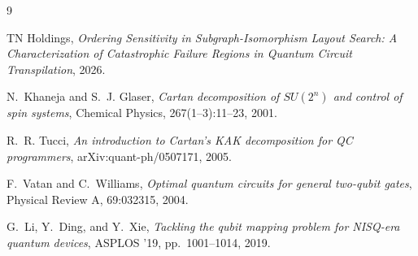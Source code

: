 \documentclass[11pt]{article}
\begin{document}
\begin{thebibliography}{9}

TN Holdings,
\emph{Ordering Sensitivity in Subgraph-Isomorphism Layout Search: A
Characterization of Catastrophic Failure Regions in Quantum Circuit
Transpilation}, 2026.

N.~Khaneja and S.~J. Glaser,
\emph{Cartan decomposition of $SU(2^n)$ and control of spin systems},
Chemical Physics, 267(1--3):11--23, 2001.

R.~R. Tucci,
\emph{An introduction to Cartan's KAK decomposition for QC
programmers}, arXiv:quant-ph/0507171, 2005.

F.~Vatan and C.~Williams,
\emph{Optimal quantum circuits for general two-qubit gates},
Physical Review A, 69:032315, 2004.

G.~Li, Y.~Ding, and Y.~Xie,
\emph{Tackling the qubit mapping problem for NISQ-era quantum devices},
ASPLOS '19, pp.~1001--1014, 2019.

\end{thebibliography}
\end{document}
